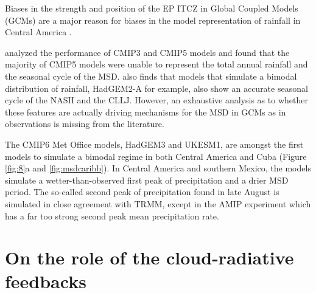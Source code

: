 Biases in the strength and position of the EP ITCZ in Global Coupled Models (GCMs) \citep{bellucci2010,li2014,schneider2014} are a major reason for biases in the model representation of rainfall in Central America  \citep{rauscher2008}. 

\cite{ryu2014} analyzed the performance of CMIP3 and CMIP5 models and found that the majority of CMIP5 models were unable to represent the total annual rainfall and the seasonal cycle of the MSD. \cite{ryu2014} also finds that models that simulate a bimodal distribution of rainfall, HadGEM2-A for example, also show an accurate seasonal cycle of the NASH and the CLLJ. However, an exhaustive analysis as to whether these features are actually driving mechanisms for the MSD in GCMs as in observations is missing from the literature. 


The CMIP6 Met Office models, HadGEM3 and UKESM1, are amongst the first models to simulate a bimodal regime in both Central America and Cuba (Figure \ref{fig:8}a and \ref{fig:msdcaribb}). 
In Central America and southern Mexico, the models simulate a wetter-than-observed first peak of precipitation and a drier MSD period.
% 
The so-called second peak of precipitation found in late August is simulated in close agreement with TRMM, except in the AMIP experiment which has a far too strong second peak mean precipitation rate.

\section{On the role of the cloud-radiative feedbacks}






